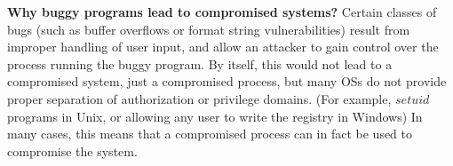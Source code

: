 \documentclass[6pt,landscape]{article}
\begin{document}
\begin{multicols}{3}
{\bf Why buggy programs lead to compromised systems?} 
Certain classes of bugs (such as buffer overflows or format string vulnerabilities) result from improper handling of user input, and allow an attacker to gain control over the process running the buggy program. By itself, this would not lead to a compromised system, just a compromised process, but many OSs do not provide proper separation of authorization or privilege domains. (For example, $setuid$ programs in Unix, or allowing any user to write the registry in Windows) In many cases, this means that a compromised process can in fact be used to compromise the system.

\scriptsize


\end{multicols}
\end{document}
